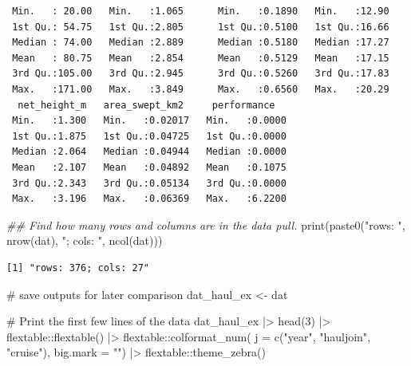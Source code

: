 \documentclass[
  letterpaper,
  oneside,
  open=any]{scrbook}
\newenvironment{Shaded}{\begin{snugshade}}{\end{snugshade}}
\newcommand{\AttributeTok}[1]{\textcolor[rgb]{0.40,0.45,0.13}{#1}}
\newcommand{\CommentTok}[1]{\textcolor[rgb]{0.37,0.37,0.37}{#1}}
\newcommand{\DecValTok}[1]{\textcolor[rgb]{0.68,0.00,0.00}{#1}}
\newcommand{\DocumentationTok}[1]{\textcolor[rgb]{0.37,0.37,0.37}{\textit{#1}}}
\newcommand{\FunctionTok}[1]{\textcolor[rgb]{0.28,0.35,0.67}{#1}}
\newcommand{\NormalTok}[1]{\textcolor[rgb]{0.00,0.23,0.31}{#1}}
\newcommand{\OtherTok}[1]{\textcolor[rgb]{0.00,0.23,0.31}{#1}}
\newcommand{\SpecialCharTok}[1]{\textcolor[rgb]{0.37,0.37,0.37}{#1}}
\newcommand{\StringTok}[1]{\textcolor[rgb]{0.13,0.47,0.30}{#1}}
\begin{document}
\begin{verbatim}
 Min.   : 20.00   Min.   :1.065      Min.   :0.1890   Min.   :12.90  
 1st Qu.: 54.75   1st Qu.:2.805      1st Qu.:0.5100   1st Qu.:16.66  
 Median : 74.00   Median :2.889      Median :0.5180   Median :17.27  
 Mean   : 80.75   Mean   :2.854      Mean   :0.5129   Mean   :17.15  
 3rd Qu.:105.00   3rd Qu.:2.945      3rd Qu.:0.5260   3rd Qu.:17.83  
 Max.   :171.00   Max.   :3.849      Max.   :0.6560   Max.   :20.29  
  net_height_m   area_swept_km2     performance    
 Min.   :1.300   Min.   :0.02017   Min.   :0.0000  
 1st Qu.:1.875   1st Qu.:0.04725   1st Qu.:0.0000  
 Median :2.064   Median :0.04944   Median :0.0000  
 Mean   :2.107   Mean   :0.04892   Mean   :0.1075  
 3rd Qu.:2.343   3rd Qu.:0.05134   3rd Qu.:0.0000  
 Max.   :3.196   Max.   :0.06369   Max.   :6.2200  
\end{verbatim}

\begin{Shaded}
\begin{Highlighting}[]
\DocumentationTok{\#\# Find how many rows and columns are in the data pull. }
\FunctionTok{print}\NormalTok{(}\FunctionTok{paste0}\NormalTok{(}\StringTok{"rows: "}\NormalTok{, }\FunctionTok{nrow}\NormalTok{(dat), }\StringTok{"; cols: "}\NormalTok{, }\FunctionTok{ncol}\NormalTok{(dat)))}
\end{Highlighting}
\end{Shaded}

\begin{verbatim}
[1] "rows: 376; cols: 27"
\end{verbatim}

\begin{Shaded}
\begin{Highlighting}[]
\CommentTok{\# save outputs for later comparison}
\NormalTok{dat\_haul\_ex }\OtherTok{\textless{}{-}}\NormalTok{ dat}
\end{Highlighting}
\end{Shaded}

\begin{Shaded}
\begin{Highlighting}[]
\CommentTok{\# Print the first few lines of the data }
\NormalTok{dat\_haul\_ex }\SpecialCharTok{|\textgreater{}} 
  \FunctionTok{head}\NormalTok{(}\DecValTok{3}\NormalTok{) }\SpecialCharTok{|\textgreater{}} 
\NormalTok{  flextable}\SpecialCharTok{::}\FunctionTok{flextable}\NormalTok{() }\SpecialCharTok{|\textgreater{}}
\NormalTok{  flextable}\SpecialCharTok{::}\FunctionTok{colformat\_num}\NormalTok{(}
      \AttributeTok{j =} \FunctionTok{c}\NormalTok{(}\StringTok{"year"}\NormalTok{, }\StringTok{"hauljoin"}\NormalTok{, }\StringTok{"cruise"}\NormalTok{), }
      \AttributeTok{big.mark =} \StringTok{""}\NormalTok{) }\SpecialCharTok{|\textgreater{}} 
\NormalTok{  flextable}\SpecialCharTok{::}\FunctionTok{theme\_zebra}\NormalTok{()}
\end{Highlighting}
\end{Shaded}
\end{document}
